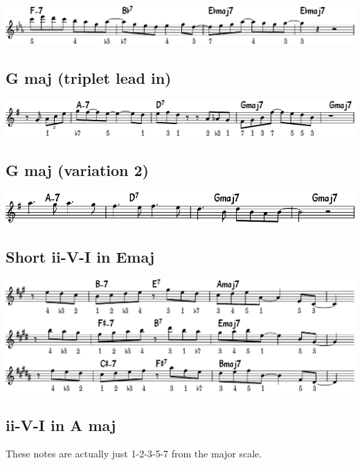 \documentclass[11pt]{article}
\begin{document}
\begin{center}
\includegraphics[width=.98\linewidth]{e-flat.pdf}
\end{center}

\subsection{G maj (triplet lead in)}
\label{sec:org9374027}
\begin{center}
\includegraphics[width=.98\linewidth]{g_maj.pdf}
\end{center}

\subsection{G maj (variation 2)}
\label{sec:org93c14a5}
\begin{center}
\includegraphics[width=.98\linewidth]{g_maj_v2.pdf}
\end{center}

\subsection{Short ii-V-I in Emaj}
\label{sec:org2652bbb}
\begin{center}
\includegraphics[width=.98\linewidth]{short-ii-v-in-Emaj.pdf}
\end{center}

\subsection{ii-V-I in A maj}
\label{sec:org23a7518}
These notes are actually just 1-2-3-5-7 from the major scale.
\end{document}
